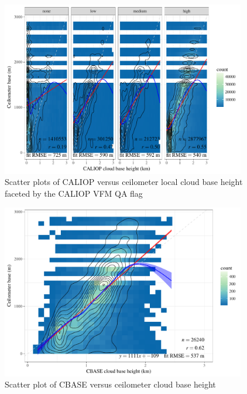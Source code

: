 \documentclass[amt,manuscript]{copernicus}\usepackage[]{graphicx}\usepackage[]{color}
\newenvironment{knitrout}{}{} %
\begin{document}
\begin{figure}
  \centering
\begin{knitrout}
\color{fgcolor}

{\centering \includegraphics[width=0.95\textwidth]{figure/method-eval-qual-1} 

}



\end{knitrout}
  \caption{Scatter plots of CALIOP versus ceilometer local cloud base height
    faceted by the CALIOP VFM QA flag}
  \label{fig:quality-qa}
\end{figure}

\begin{figure}
  \centering
\begin{knitrout}
\color{fgcolor}

{\centering \includegraphics[width=0.95\textwidth]{figure/method-combo-plot-1} 

}



\end{knitrout}
  \caption{Scatter plot of CBASE versus ceilometer cloud base height}
  \label{fig:eval}
\end{figure}
\end{document}
